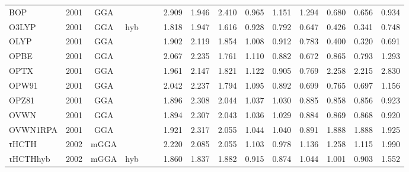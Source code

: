 \begin{landscape}
\begin{longtable}{lcccccrrrrrrrrr}
    BOP              & 2001 & GGA  &          &             &           & 2.909             & 1.946             & 2.410  & 0.965              & 1.151             & 1.294  & 0.680   & 0.656 & 0.934 \\
    O3LYP            & 2001 & GGA  & hyb      &             &           & 1.818             & 1.947             & 1.616  & 0.928              & 0.792             & 0.647  & 0.426   & 0.341 & 0.748 \\
    OLYP             & 2001 & GGA  &          &             &           & 1.902             & 2.119             & 1.854  & 1.008              & 0.912             & 0.783  & 0.400   & 0.320 & 0.691 \\
    OPBE             & 2001 & GGA  &          &             &           & 2.067             & 2.235             & 1.761  & 1.110              & 0.882             & 0.672  & 0.865   & 0.793 & 1.293 \\
    OPTX             & 2001 & GGA  &          &             &           & 1.961             & 2.147             & 1.821  & 1.122              & 0.905             & 0.769  & 2.258   & 2.215 & 2.830 \\
    OPW91            & 2001 & GGA  &          &             &           & 2.042             & 2.237             & 1.794  & 1.095              & 0.892             & 0.699  & 0.765   & 0.697 & 1.156 \\
    OPZ81            & 2001 & GGA  &          &             &           & 1.896             & 2.308             & 2.044  & 1.037              & 1.030             & 0.885  & 0.858   & 0.856 & 0.923 \\
    OVWN             & 2001 & GGA  &          &             &           & 1.894             & 2.307             & 2.043  & 1.036              & 1.029             & 0.884  & 0.869   & 0.868 & 0.920 \\
    OVWN1RPA         & 2001 & GGA  &          &             &           & 1.921             & 2.317             & 2.055  & 1.044              & 1.040             & 0.891  & 1.888   & 1.888 & 1.925 \\
    τHCTH            & 2002 & mGGA &          &             &           & 2.220             & 2.085             & 2.055  & 1.103              & 0.978             & 1.136  & 1.258   & 1.115 & 1.990 \\
    τHCTHhyb         & 2002 & mGGA & hyb      &             &           & 1.860             & 1.837             & 1.882  & 0.915              & 0.874             & 1.044  & 1.001   & 0.903 & 1.552 \\

\end{longtable}
\end{landscape}
